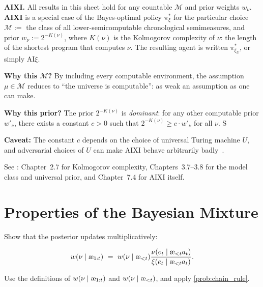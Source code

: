 \documentclass[fontsize=11pt, parskip=half]{scrartcl}
\newcommand{\cM}{\mathcal{M}}
\newcommand{\aes}{\textnormal{\ae}}
\begin{document}
\begin{callout}[note]
\textbf{AIXI.}
All results in this sheet hold for any countable $\cM$ and prior weights $w_\nu$.
\textbf{AIXI} is a special case of the Bayes-optimal policy $\pi_\xi^*$ for the particular choice $\cM :=$ the class of all lower-semicomputable chronological semimeasures, and prior $w_\nu := 2^{-K(\nu)}$, where $K(\nu)$ is the Kolmogorov complexity of $\nu$: the length of the shortest program that computes $\nu$.
The resulting agent is written $\pi^*_{\xi_U}$, or simply AI$\xi$.

\textbf{Why this $\cM$?}
By including every computable environment, the assumption $\mu \in \cM$ reduces to ``the universe is computable'': as weak an assumption as one can make.

\textbf{Why this prior?}
The prior $2^{-K(\nu)}$ is \emph{dominant}: for any other computable prior $w'_\nu$, there exists a constant $c > 0$ such that $2^{-K(\nu)} \geq c \cdot w'_\nu$ for all $\nu$. S

\textbf{Caveat:}
The constant $c$ depends on the choice of universal Turing machine $U$, and adversarial choices of $U$ can make AIXI behave arbitrarily badly~\cite{Leike:15badpriors}.

See \cite{Hutter:24uaibook2}: Chapter~2.7 for Kolmogorov complexity, Chapters~3.7--3.8 for the model class and universal prior, and Chapter~7.4 for AIXI itself.
\end{callout}


\section{Properties of the Bayesian Mixture}\label{prob:mixture_props}



\begin{exercise}
\label{prob:posterior_update}
\skippable
Show that the posterior updates multiplicatively:

\[
    w(\nu \mid \aes_{1:t}) ~=~ w(\nu \mid \aes_{<t}) \frac{\nu(e_t \mid \aes_{<t} a_t)}{\xi(e_t \mid \aes_{<t} a_t)}.
\]
\begin{hint}
Use the definitions of $w(\nu \mid \aes_{1:t})$ and $w(\nu \mid \aes_{<t})$, and apply \cref{prob:chain_rule}.
\end{hint}
\end{exercise}
\end{document}

